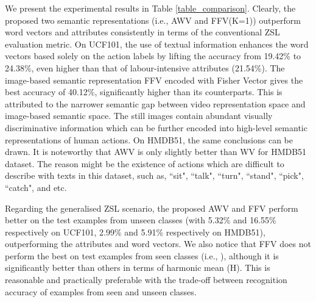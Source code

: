 \documentclass[runningheads,a4paper] {llncs}
\begin{document}
We present the experimental results in Table \ref{table_comparison}. Clearly, the proposed two semantic representations (i.e., AWV and FFV(K=1)) outperform word vectors and attributes consistently in terms of the conventional ZSL evaluation metric. On UCF101, the use of textual information enhances the word vectors based solely on the action labels by lifting the accuracy from 19.42\% to 24.38\%, even higher than that of labour-intensive attributes (21.54\%). The image-based semantic representation FFV encoded with Fisher Vector gives the best accuracy of 40.12\%, significantly higher than its counterparts. This is attributed to the narrower semantic gap between video representation space and image-based semantic space. The still images contain abundant visually discriminative information which can be further encoded into high-level semantic representations of human actions. On HMDB51, the same conclusions can be drawn. It is noteworthy that AWV is only slightly better than WV for HMDB51 dataset. The reason might be the existence of actions which are difficult to describe with texts in this dataset, such as, ``sit", ``talk", ``turn", ``stand", ``pick", ``catch", and etc.

Regarding the generalised ZSL scenario, the proposed AWV and FFV perform better on the test examples from unseen classes (with 5.32\% and 16.55\% respectively on UCF101, 2.99\% and 5.91\% respectively on HMDB51), outperforming the attributes and word vectors. We also notice that FFV does not perform the best on test examples from seen classes (i.e., ), although it is significantly better than others in terms of harmonic mean (H). This is reasonable and practically preferable with the trade-off between recognition accuracy of examples from seen and unseen classes.
\end{document}

